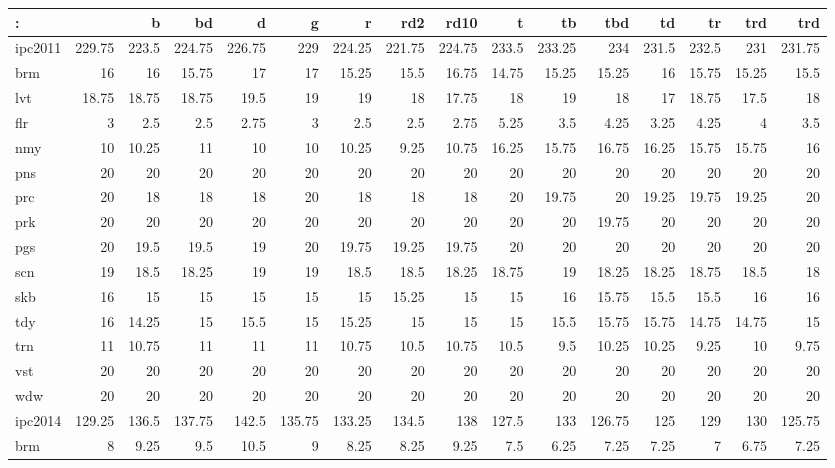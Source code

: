 \begin{center}
\begin{tabular}{lrrrrrrrrrrrrrrr}
: &  & b & bd & d & g & r & rd2 & rd10 & t & tb & tbd & td & tr & trd & trd\\
\hline
ipc2011 & 229.75 & 223.5 & 224.75 & 226.75 & 229 & 224.25 & 221.75 & 224.75 & 233.5 & 233.25 & 234 & 231.5 & 232.5 & 231 & 231.75\\
brm & 16 & 16 & 15.75 & 17 & 17 & 15.25 & 15.5 & 16.75 & 14.75 & 15.25 & 15.25 & 16 & 15.75 & 15.25 & 15.5\\
lvt & 18.75 & 18.75 & 18.75 & 19.5 & 19 & 19 & 18 & 17.75 & 18 & 19 & 18 & 17 & 18.75 & 17.5 & 18\\
flr & 3 & 2.5 & 2.5 & 2.75 & 3 & 2.5 & 2.5 & 2.75 & 5.25 & 3.5 & 4.25 & 3.25 & 4.25 & 4 & 3.5\\
nmy & 10 & 10.25 & 11 & 10 & 10 & 10.25 & 9.25 & 10.75 & 16.25 & 15.75 & 16.75 & 16.25 & 15.75 & 15.75 & 16\\
pns & 20 & 20 & 20 & 20 & 20 & 20 & 20 & 20 & 20 & 20 & 20 & 20 & 20 & 20 & 20\\
prc & 20 & 18 & 18 & 18 & 20 & 18 & 18 & 18 & 20 & 19.75 & 20 & 19.25 & 19.75 & 19.25 & 20\\
prk & 20 & 20 & 20 & 20 & 20 & 20 & 20 & 20 & 20 & 20 & 19.75 & 20 & 20 & 20 & 20\\
pgs & 20 & 19.5 & 19.5 & 19 & 20 & 19.75 & 19.25 & 19.75 & 20 & 20 & 20 & 20 & 20 & 20 & 20\\
scn & 19 & 18.5 & 18.25 & 19 & 19 & 18.5 & 18.5 & 18.25 & 18.75 & 19 & 18.25 & 18.25 & 18.75 & 18.5 & 18\\
skb & 16 & 15 & 15 & 15 & 15 & 15 & 15.25 & 15 & 15 & 16 & 15.75 & 15.5 & 15.5 & 16 & 16\\
tdy & 16 & 14.25 & 15 & 15.5 & 15 & 15.25 & 15 & 15 & 15 & 15.5 & 15.75 & 15.75 & 14.75 & 14.75 & 15\\
trn & 11 & 10.75 & 11 & 11 & 11 & 10.75 & 10.5 & 10.75 & 10.5 & 9.5 & 10.25 & 10.25 & 9.25 & 10 & 9.75\\
vst & 20 & 20 & 20 & 20 & 20 & 20 & 20 & 20 & 20 & 20 & 20 & 20 & 20 & 20 & 20\\
wdw & 20 & 20 & 20 & 20 & 20 & 20 & 20 & 20 & 20 & 20 & 20 & 20 & 20 & 20 & 20\\
\hline
ipc2014 & 129.25 & 136.5 & 137.75 & 142.5 & 135.75 & 133.25 & 134.5 & 138 & 127.5 & 133 & 126.75 & 125 & 129 & 130 & 125.75\\
brm & 8 & 9.25 & 9.5 & 10.5 & 9 & 8.25 & 8.25 & 9.25 & 7.5 & 6.25 & 7.25 & 7.25 & 7 & 6.75 & 7.25\\

\end{tabular}
\end{center}
